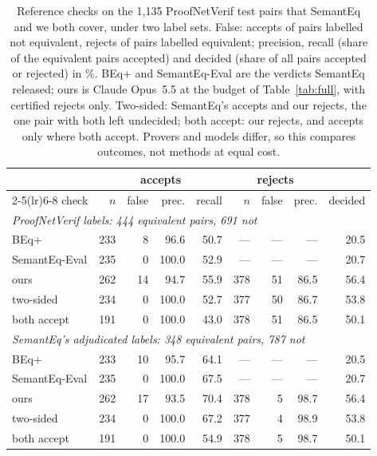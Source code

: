 \documentclass[10pt]{article}
\theoremstyle{definition}
\begin{document}
\begin{table}[t]
\centering\small
\begin{tabular}{lrrrrrrrr}
\toprule
& \multicolumn{4}{c}{accepts} & \multicolumn{3}{c}{rejects} & \\
\cmidrule(lr){2-5}\cmidrule(lr){6-8}
check & $n$ & false & prec. & recall & $n$ & false & prec. & decided\\
\midrule
\multicolumn{9}{l}{\emph{ProofNetVerif labels: 444 equivalent pairs, 691 not}}\\
BEq+ & 233 & 8 & 96.6 & 50.7 & --- & --- & --- & 20.5\\
SemantEq-Eval & 235 & 0 & 100.0 & 52.9 & --- & --- & --- & 20.7\\
ours & 262 & 14 & 94.7 & 55.9 & 378 & 51 & 86.5 & 56.4\\
two-sided & 234 & 0 & 100.0 & 52.7 & 377 & 50 & 86.7 & 53.8\\
both accept & 191 & 0 & 100.0 & 43.0 & 378 & 51 & 86.5 & 50.1\\
\midrule
\multicolumn{9}{l}{\emph{SemantEq's adjudicated labels: 348 equivalent pairs, 787 not}}\\
BEq+ & 233 & 10 & 95.7 & 64.1 & --- & --- & --- & 20.5\\
SemantEq-Eval & 235 & 0 & 100.0 & 67.5 & --- & --- & --- & 20.7\\
ours & 262 & 17 & 93.5 & 70.4 & 378 & 5 & 98.7 & 56.4\\
two-sided & 234 & 0 & 100.0 & 67.2 & 377 & 4 & 98.9 & 53.8\\
both accept & 191 & 0 & 100.0 & 54.9 & 378 & 5 & 98.7 & 50.1\\
\bottomrule
\end{tabular}
\caption{Reference checks on the 1,135 ProofNetVerif test pairs that SemantEq and we both cover,
under two label sets. False: accepts of pairs labelled not equivalent, rejects of pairs labelled
equivalent; precision, recall (share of the equivalent pairs accepted) and decided (share of all
pairs accepted or rejected) in \%. BEq+ and SemantEq-Eval are the verdicts SemantEq released; ours
is Claude Opus~5.5 at the budget of Table~\ref{tab:full}, with certified rejects only. Two-sided:
SemantEq's accepts and our rejects, the one pair with both left undecided; both accept: our rejects,
and accepts only where both accept. Provers and models differ, so this compares outcomes, not
methods at equal cost.}
\label{tab:common}
\end{table}
\end{document}
